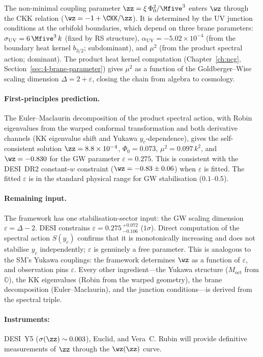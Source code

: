 The non-minimal coupling parameter $\zz = \xi\,\Phi_0^2/\Mfive^3$ enters $\wz$ through the CKK relation ($\wz = -1 + \CKK/\zz$). It is determined by the UV junction conditions at the orbifold boundaries, which depend on three brane parameters: $\sigma_\mathrm{UV} = 6\,\Mfive^3\,k$ (fixed by RS structure), $\alpha_\mathrm{UV} = -5.02 \times 10^{-4}$ (from the boundary heat kernel $b_{3/2}$; subdominant), and $\mu^2$ (from the product spectral action; dominant). The product heat kernel computation (Chapter~\ref{ch:ncg}, Section~\ref{sec:4-brane-parameter}) gives $\mu^2$ as a function of the Goldberger--Wise scaling dimension $\Delta = 2 + \varepsilon$, closing the chain from algebra to cosmology.

\paragraph{First-principles prediction.} The Euler--Maclaurin decomposition of the product spectral action, with Robin eigenvalues from the warped conformal transformation and both derivative channels (KK eigenvalue shift and Yukawa $y_c$-dependence), gives the self-consistent solution $\zz = 8.8 \times 10^{-4}$, $\Phi_0 = 0.073$, $\mu^2 = 0.097\,k^2$, and $\wz = -0.830$ for the GW parameter $\varepsilon = 0.275$.  This is consistent with the DESI~DR2 constant-$w$ constraint ($\wz = -0.83 \pm 0.06$) when $\varepsilon$ is fitted.  The fitted $\varepsilon$ is in the standard physical range for GW stabilisation ($0.1$--$0.5$).

\paragraph{Remaining input.} The framework has one stabilisation-sector input: the GW scaling dimension $\varepsilon = \Delta - 2$.  DESI constrains $\varepsilon = 0.275\,{}^{+0.072}_{-0.106}$ ($1\sigma$).  Direct computation of the spectral action $S(y_c)$ confirms that it is monotonically increasing and does not stabilise $y_c$ independently; $\varepsilon$ is genuinely a free parameter.  This is analogous to the SM's Yukawa couplings: the framework determines $\wz$ as a function of $\varepsilon$, and observation pins $\varepsilon$.  Every other ingredient---the Yukawa structure ($M_{\mathrm{oct}}$ from $\mathbb{O}$), the KK eigenvalues (Robin from the warped geometry), the brane decomposition (Euler--Maclaurin), and the junction conditions---is derived from the spectral triple.

\paragraph{Instruments:} DESI~Y5 ($\sigma(\zz) \sim 0.003$), Euclid, and Vera~C. Rubin will provide definitive measurements of $\zz$ through the $\wz(\zz)$ curve.



